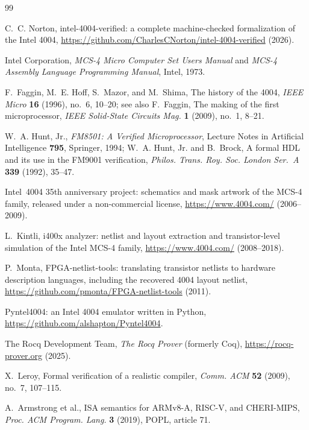 \documentclass[11pt]{amsart}
\theoremstyle{plain}
\theoremstyle{definition}
\begin{document}
\begin{thebibliography}{99}
\raggedright

 C.~C. Norton, intel-4004-verified: a complete machine-checked formalization of the Intel 4004, \url{https://github.com/CharlesCNorton/intel-4004-verified} (2026).

 Intel Corporation, \emph{MCS-4 Micro Computer Set Users Manual} and \emph{MCS-4 Assembly Language Programming Manual}, Intel, 1973.

 F.~Faggin, M.~E. Hoff, S.~Mazor, and M.~Shima, The history of the 4004, \emph{IEEE Micro} \textbf{16} (1996), no.~6, 10--20; see also F.~Faggin, The making of the first microprocessor, \emph{IEEE Solid-State Circuits Mag.} \textbf{1} (2009), no.~1, 8--21.

 W.~A. Hunt, Jr., \emph{FM8501: A Verified Microprocessor}, Lecture Notes in Artificial Intelligence \textbf{795}, Springer, 1994; W.~A. Hunt, Jr. and B.~Brock, A formal HDL and its use in the FM9001 verification, \emph{Philos. Trans. Roy. Soc. London Ser.~A} \textbf{339} (1992), 35--47.

 Intel~4004 35th anniversary project: schematics and mask artwork of the MCS-4 family, released under a non-commercial license, \url{https://www.4004.com/} (2006--2009).

 L.~Kintli, i400x analyzer: netlist and layout extraction and transistor-level simulation of the Intel MCS-4 family, \url{https://www.4004.com/} (2008--2018).

 P.~Monta, FPGA-netlist-tools: translating transistor netlists to hardware description languages, including the recovered 4004 layout netlist, \url{https://github.com/pmonta/FPGA-netlist-tools} (2011).

 Pyntel4004: an Intel 4004 emulator written in Python, \url{https://github.com/alshapton/Pyntel4004}.

 The Rocq Development Team, \emph{The Rocq Prover} (formerly Coq), \url{https://rocq-prover.org} (2025).

 X.~Leroy, Formal verification of a realistic compiler, \emph{Comm. ACM} \textbf{52} (2009), no.~7, 107--115.

 A.~Armstrong et al., ISA semantics for ARMv8-A, RISC-V, and CHERI-MIPS, \emph{Proc. ACM Program. Lang.} \textbf{3} (2019), POPL, article 71.

\end{thebibliography}
\end{document}
